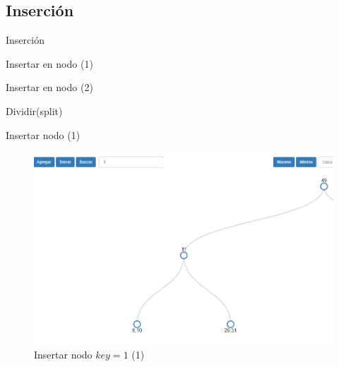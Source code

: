 \documentclass[11pt]{beamer}
\begin{document}
		\subsection{Inserción}
		\begin{frame}{Inserción}
			\justifying
			
		\end{frame}
		
		\begin{frame}{Insertar en nodo (1)}
			\justifying
			
		\end{frame}
		\begin{frame}{Insertar en nodo (2)}
			\justifying
			
		\end{frame}
		
		\begin{frame}{Dividir(split)}
			\justifying
			
		\end{frame}
		
		\begin{frame}{Insertar nodo (1)}
			\justifying
			\begin{figure}[H]
				\centering
				\includegraphics[scale=0.35]{img/btree_ins_1.png}
				\caption{Insertar nodo $key=1$ (1)}
				\label{fig:btree_ins_1}
			\end{figure}
		\end{frame}
		
\end{document}
